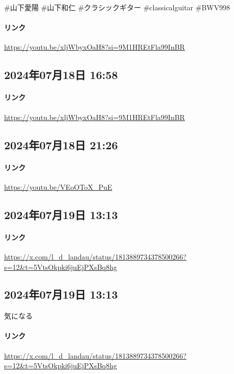 \#山下愛陽 \#山下和仁 \#クラシックギター \#classicalguitar \#BWV998

\paragraph{リンク}
\url{https://youtu.be/xljWbyxOaH8?si=9M1HREtFla99InBR}

\subsection*{2024年07月18日 16:58}

\paragraph{リンク}
\url{https://youtu.be/xljWbyxOaH8?si=9M1HREtFla99InBR}

\subsection*{2024年07月18日 21:26}

\paragraph{リンク}
\url{https://youtu.be/VEoOToX_PuE}

\subsection*{2024年07月19日 13:13}

\paragraph{リンク}
\url{https://x.com/l_d_landau/status/1813889734378500266?s=12&t=5VtsOkpki6juEjPXsBq8hg}

\subsection*{2024年07月19日 13:13}

気になる

\paragraph{リンク}
\url{https://x.com/l_d_landau/status/1813889734378500266?s=12&t=5VtsOkpki6juEjPXsBq8hg}


